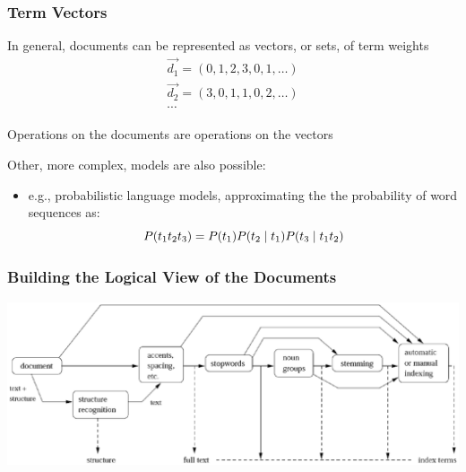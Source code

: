 \documentclass[svgnames]{beamer}
\begin{document}

\begin{frame}
    \frametitle{Term Vectors}

    \begin{block}{}
        In general, documents can be represented as vectors, or sets, of term
        weights
        \begin{displaymath}
            \begin{array}{ll}
              \vec{d_1} = ( 0, 1, 2, 3, 0, 1, \ldots ) \\
              \vec{d_2} = ( 3, 0, 1, 1, 0, 2, \ldots ) \\
              \cdots
            \end{array}
        \end{displaymath}

        Operations on the documents are operations on the vectors
        
    \end{block}

    \begin{block}{}
        Other, more complex, models are also possible:
        \begin{itemize}
        \item e.g., probabilistic language models, approximating the the probability of word sequences as:
            \begin{displaymath}\footnotesize
                P(t_{1}t_{2}t_{3})=P(t_{1})P(t_{2}\mid t_{1})P(t_{3}\mid t_{1}t_{2})
            \end{displaymath}
        \end{itemize}
    \end{block}


\end{frame}


\begin{frame}
    \frametitle{Building the Logical View of the Documents}

    \begin{block}{}
        \includegraphics[width=\textwidth]{logical}
    \end{block}  
    
\end{frame}
\end{document}
